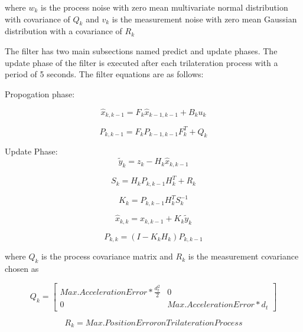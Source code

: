 where $w_k$ is the process noise with zero mean multivariate normal distribution with covariance of $Q_k$ and $v_k$ is the measurement noise with zero mean Gaussian distribution with a covariance of $R_k$
		
The filter has two main subsections named predict and update phases. The update phase of the filter is executed after each trilateration process with a period of 5 seconds. The filter equations are as follows:
		
Propogation phase:

\begin{equation}
\hat{x}_{k,k-1} = F_k\hat{x}_{k-1,k-1} + B_ku_k
\end{equation}
		
\begin{equation}
 P_{k,k-1} = F_k P_{k-1,k-1}F^T_k + Q_k
\end{equation}
		
Update Phase:
\begin{equation}
\tilde{y}_k = z_k - H_k  \hat{x}_{k,k-1} 
\end{equation}

\begin{equation}
S_k = H_k P_{k,k-1} H^T_k + R_k
\end{equation}

\begin{equation}
K_k =  P_{k,k-1} H^T_kS_k^{-1}
\end{equation}
		
\begin{equation}
 \hat{x}_{k,k} =  \hat{x}_{k,k-1} + K_k \tilde{y}_k
\end{equation}
		
\begin{equation}
P_{k,k} = (I - K_kH_k)P_{k,k-1}
\end{equation}
		
where $Q_k$ is the process covariance matrix and $R_k$ is the measurement covariance chosen as 

\begin{equation}
Q_k = \begin{bmatrix}
Max. Acceleration Error * \frac{d^2_t}{2} & 0 \\
0 & Max. Acceleration Error * d_t
\end{bmatrix}
\end{equation}
		
\begin{equation}
R_k = Max. Position Error on Trilateration Process
\end{equation}
		
